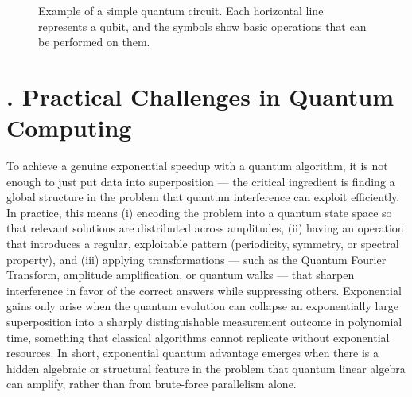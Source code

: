 \documentclass{elbioimp2}
\begin{document}


\begin{figure}[h]
  \centering
  \caption{Example of a simple quantum circuit. Each horizontal line represents a qubit, and the symbols show basic operations that can be performed on them.}
\end{figure}

\section{. Practical Challenges in Quantum Computing}
To achieve a genuine exponential speedup with a quantum algorithm, it is not enough to just put data into superposition — 
the critical ingredient is finding a global structure in the problem that quantum interference can exploit efficiently. In practice, this means (i) encoding the 
problem into a quantum state space so that relevant solutions are distributed across amplitudes, (ii) having an operation that introduces a regular, 
exploitable pattern (periodicity, symmetry, or spectral property), and (iii) applying transformations — such as the Quantum Fourier Transform, amplitude amplification, 
or quantum walks — that sharpen interference in favor of the correct answers while suppressing others. Exponential gains only arise when the quantum evolution can 
collapse an exponentially large superposition into a sharply distinguishable measurement outcome in polynomial time, something that classical algorithms cannot 
replicate without exponential resources. In short, exponential quantum advantage emerges when there is a hidden algebraic or structural feature in the problem that 
quantum linear algebra can amplify, rather than from brute-force parallelism alone.
\end{document}
